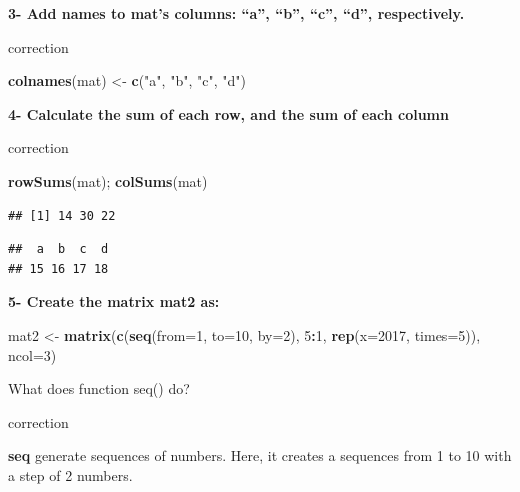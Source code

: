 \documentclass[]{book}
\newenvironment{Shaded}{\begin{snugshade}}{\end{snugshade}}
\newcommand{\DataTypeTok}[1]{\textcolor[rgb]{0.13,0.29,0.53}{#1}}
\newcommand{\DecValTok}[1]{\textcolor[rgb]{0.00,0.00,0.81}{#1}}
\newcommand{\KeywordTok}[1]{\textcolor[rgb]{0.13,0.29,0.53}{\textbf{#1}}}
\newcommand{\NormalTok}[1]{#1}
\newcommand{\OperatorTok}[1]{\textcolor[rgb]{0.81,0.36,0.00}{\textbf{#1}}}
\newcommand{\StringTok}[1]{\textcolor[rgb]{0.31,0.60,0.02}{#1}}
\begin{document}
\textbf{3- Add names to mat's columns: ``a'', ``b'', ``c'', ``d'', respectively.}

correction

\begin{Shaded}
\begin{Highlighting}[]
\KeywordTok{colnames}\NormalTok{(mat) <-}\StringTok{ }\KeywordTok{c}\NormalTok{(}\StringTok{"a"}\NormalTok{, }\StringTok{"b"}\NormalTok{, }\StringTok{"c"}\NormalTok{, }\StringTok{"d"}\NormalTok{)}
\end{Highlighting}
\end{Shaded}

\textbf{4- Calculate the sum of each row, and the sum of each column}

correction

\begin{Shaded}
\begin{Highlighting}[]
\KeywordTok{rowSums}\NormalTok{(mat); }\KeywordTok{colSums}\NormalTok{(mat)}
\end{Highlighting}
\end{Shaded}

\begin{verbatim}
## [1] 14 30 22
\end{verbatim}

\begin{verbatim}
##  a  b  c  d 
## 15 16 17 18
\end{verbatim}

\textbf{5- Create the matrix mat2 as:}

\begin{Shaded}
\begin{Highlighting}[]
\NormalTok{mat2 <-}\StringTok{ }\KeywordTok{matrix}\NormalTok{(}\KeywordTok{c}\NormalTok{(}\KeywordTok{seq}\NormalTok{(}\DataTypeTok{from=}\DecValTok{1}\NormalTok{, }\DataTypeTok{to=}\DecValTok{10}\NormalTok{, }\DataTypeTok{by=}\DecValTok{2}\NormalTok{), }\DecValTok{5}\OperatorTok{:}\DecValTok{1}\NormalTok{, }\KeywordTok{rep}\NormalTok{(}\DataTypeTok{x=}\DecValTok{2017}\NormalTok{, }\DataTypeTok{times=}\DecValTok{5}\NormalTok{)), }\DataTypeTok{ncol=}\DecValTok{3}\NormalTok{)}
\end{Highlighting}
\end{Shaded}

What does function seq() do?

correction

\textbf{seq} generate sequences of numbers. Here, it creates a sequences from 1 to 10 with a step of 2 numbers.
\end{document}
